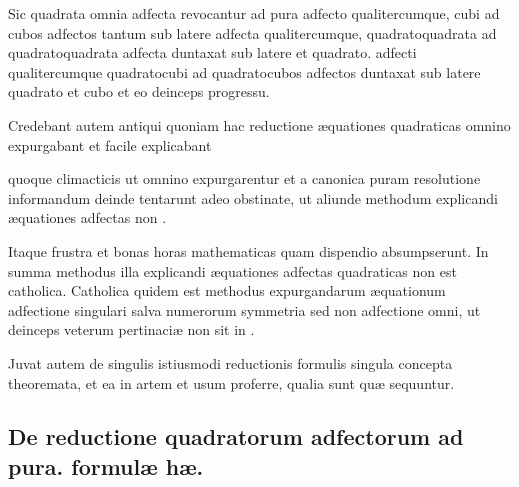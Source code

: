 \documentclass[11pt,a4paper]{article}
\begin{document}
Sic quadrata omnia adfecta revocantur ad pura adfecto qualitercumque, cubi ad cubos adfectos tantum sub latere adfecta qualitercumque, quadratoquadrata ad quadratoquadrata adfecta duntaxat sub latere et quadrato. adfecti qualitercumque quadratocubi ad quadratocubos adfectos duntaxat sub latere quadrato et cubo et eo deinceps progressu.

Credebant autem antiqui quoniam hac reductione æquationes quadraticas omnino expurgabant et facile explicabant


 quoque climacticis  ut omnino expurgarentur et a canonica puram resolutione informandum  deinde tentarunt adeo obstinate, ut aliunde methodum explicandi æquationes adfectas non .

Itaque  \ill{} frustra et bonas horas mathematicas quam  dispendio absumpserunt. In summa methodus illa explicandi æquationes adfectas quadraticas non est catholica. Catholica quidem est methodus expurgandarum æquationum adfectione singulari salva numerorum symmetria sed non adfectione omni, ut deinceps veterum pertinaciæ non sit in .

Juvat autem de singulis istiusmodi reductionis formulis singula concepta theoremata, et ea in artem et usum proferre, qualia sunt quæ sequuntur.

\subsection*{De reductione quadratorum adfectorum ad pura. formulæ hæ.}
\end{document}
